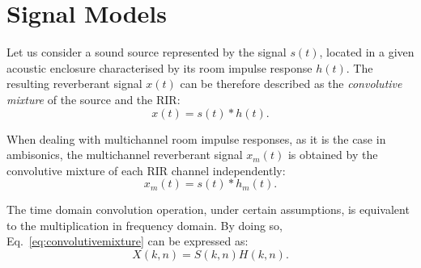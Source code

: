 %
%




\section{Signal Models}


Let us consider a sound source represented by the signal $s(t)$, located in a given acoustic enclosure characterised by its room impulse response $h(t)$. The resulting reverberant signal $x(t)$ can be therefore described as the \textit{convolutive mixture} of the source and the RIR: 
\begin{equation}
	x(t) = s(t) \ast h(t).
\label{eq:convolutivemixture}
\end{equation}

\newpage
When dealing with multichannel room impulse responses, as it is the case in ambisonics, the multichannel reverberant signal $x_m(t)$ is obtained by the convolutive mixture of each RIR channel independently:
\begin{equation}
	x_m(t) = s(t) \ast h_m(t).
\label{eq:convolutivemixturemultichannel}
\end{equation}

The time domain convolution operation, under certain assumptions, is equivalent to the multiplication in frequency domain. By doing so, Eq.~\ref{eq:convolutivemixture} can be expressed as:
\begin{equation}
	X(k,n) = S(k,n) H(k,n).
\label{eq:multiplicativetransferfunction}
\end{equation}

